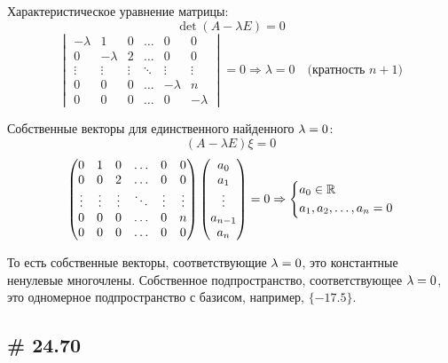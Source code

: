 \documentclass[a4paper,12pt]{article}
\begin{document}
\begin{solution}
    Характеристическое уравнение матрицы:
    \[
      \det(A - \lambda E) = 0
    \]
    \[
      \begin{vmatrix}
        -\lambda & 1        & 0      & \ldots & 0        & 0\\
        0        & -\lambda & 2      & \ldots & 0        & 0\\
        \vdots   & \vdots   & \vdots & \ddots & \vdots   & \vdots\\
        0        & 0        & 0      & \ldots & -\lambda & n\\
        0        & 0        & 0      & \ldots & 0        & -\lambda
      \end{vmatrix} = 0
      \Rightarrow \lambda = 0\quad \mbox{(кратность $n + 1$)}
    \]
    
    Собственные векторы для единственного найденного $\lambda \hm= 0$:
    \[
      (A - \lambda E) \xi = 0
    \]
    \[
      \begin{pmatrix}
        0      & 1      & 0      & \ldots & 0      & 0\\
        0      & 0      & 2      & \ldots & 0      & 0\\
        \vdots & \vdots & \vdots & \ddots & \vdots & \vdots\\
        0      & 0      & 0      & \ldots & 0      & n\\
        0      & 0      & 0      & \ldots & 0      & 0
      \end{pmatrix} \begin{pmatrix}
        a_0\\
        a_1\\
        \vdots\\
        a_{n - 1}\\
        a_n
      \end{pmatrix} = 0
      \Rightarrow \left\{
        \begin{aligned}
          &a_0 \in \operatorname{\mathbb R}\\
          &a_1, a_2, \ldots, a_n = 0
        \end{aligned}
      \right.
    \]
    
    То есть собственные векторы, соответствующие $\lambda \hm= 0$, это константные ненулевые многочлены.
    Собственное подпространство, соответствующее $\lambda \hm= 0$, это одномерное подпространство с базисом, например, $\{-17.5\}$.
  \end{solution}
  
  
  \subsection{\# 24.70}
  
\end{document}
